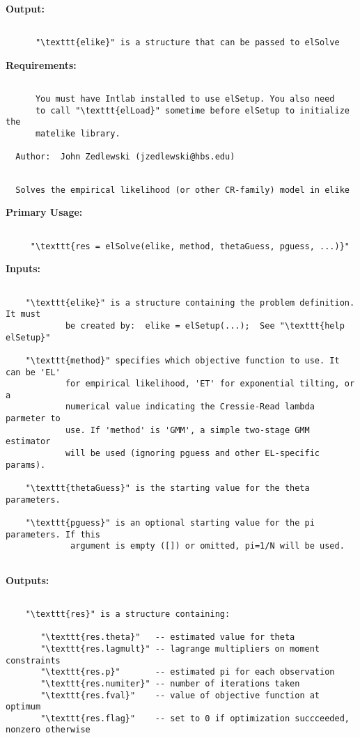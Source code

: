{\small\textbf{Output:}}
\begin{lstlisting}
 
      "\texttt{elike}" is a structure that can be passed to elSolve
 \end{lstlisting}
{\small\textbf{Requirements:}}
\begin{lstlisting}
 
      You must have Intlab installed to use elSetup. You also need
      to call "\texttt{elLoad}" sometime before elSetup to initialize the
      matelike library.
 
  Author:  John Zedlewski (jzedlewski@hbs.edu)
 

\end{lstlisting}
\begin{lstlisting}
  Solves the empirical likelihood (or other CR-family) model in elike
 \end{lstlisting}
{\small\textbf{Primary Usage:}}
\begin{lstlisting}
 
     "\texttt{res = elSolve(elike, method, thetaGuess, pguess, ...)}"
 \end{lstlisting}
{\small\textbf{Inputs:}}
\begin{lstlisting}
  
    "\texttt{elike}" is a structure containing the problem definition. It must
            be created by:  elike = elSetup(...);  See "\texttt{help elSetup}"
 
    "\texttt{method}" specifies which objective function to use. It can be 'EL'
            for empirical likelihood, 'ET' for exponential tilting, or a
            numerical value indicating the Cressie-Read lambda parmeter to
            use. If 'method' is 'GMM', a simple two-stage GMM estimator
            will be used (ignoring pguess and other EL-specific params).
             
    "\texttt{thetaGuess}" is the starting value for the theta parameters.
 
    "\texttt{pguess}" is an optional starting value for the pi parameters. If this
             argument is empty ([]) or omitted, pi=1/N will be used.
 
 \end{lstlisting}
{\small\textbf{Outputs:}}
\begin{lstlisting}
 
    "\texttt{res}" is a structure containing:
 
       "\texttt{res.theta}"   -- estimated value for theta
       "\texttt{res.lagmult}" -- lagrange multipliers on moment constraints
       "\texttt{res.p}"       -- estimated pi for each observation
       "\texttt{res.numiter}" -- number of iterations taken
       "\texttt{res.fval}"    -- value of objective function at optimum
       "\texttt{res.flag}"    -- set to 0 if optimization succceeded, nonzero otherwise
 \end{lstlisting}
